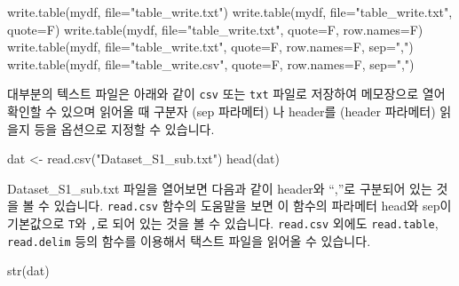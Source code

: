 \documentclass[
]{book}
\newenvironment{Shaded}{\begin{snugshade}}{\end{snugshade}}
\newcommand{\AttributeTok}[1]{\textcolor[rgb]{0.77,0.63,0.00}{#1}}
\newcommand{\FunctionTok}[1]{\textcolor[rgb]{0.00,0.00,0.00}{#1}}
\newcommand{\NormalTok}[1]{#1}
\newcommand{\OtherTok}[1]{\textcolor[rgb]{0.56,0.35,0.01}{#1}}
\newcommand{\StringTok}[1]{\textcolor[rgb]{0.31,0.60,0.02}{#1}}
\begin{document}
\begin{Shaded}
\begin{Highlighting}[]

\FunctionTok{write.table}\NormalTok{(mydf, }\AttributeTok{file=}\StringTok{"table\_write.txt"}\NormalTok{)}
\FunctionTok{write.table}\NormalTok{(mydf, }\AttributeTok{file=}\StringTok{"table\_write.txt"}\NormalTok{, }\AttributeTok{quote=}\NormalTok{F)}
\FunctionTok{write.table}\NormalTok{(mydf, }\AttributeTok{file=}\StringTok{"table\_write.txt"}\NormalTok{, }\AttributeTok{quote=}\NormalTok{F, }\AttributeTok{row.names=}\NormalTok{F)}
\FunctionTok{write.table}\NormalTok{(mydf, }\AttributeTok{file=}\StringTok{"table\_write.txt"}\NormalTok{, }\AttributeTok{quote=}\NormalTok{F, }\AttributeTok{row.names=}\NormalTok{F, }\AttributeTok{sep=}\StringTok{","}\NormalTok{)}
\FunctionTok{write.table}\NormalTok{(mydf, }\AttributeTok{file=}\StringTok{"table\_write.csv"}\NormalTok{, }\AttributeTok{quote=}\NormalTok{F, }\AttributeTok{row.names=}\NormalTok{F, }\AttributeTok{sep=}\StringTok{","}\NormalTok{)}
\end{Highlighting}
\end{Shaded}

대부분의 텍스트 파일은 아래와 같이 \texttt{csv} 또는 \texttt{txt} 파일로 저장하여 메모장으로 열어 확인할 수 있으며 읽어올 때 구분자 (sep 파라메터) 나 header를 (header 파라메터) 읽을지 등을 옵션으로 지정할 수 있습니다.

\begin{Shaded}
\begin{Highlighting}[]
\NormalTok{dat }\OtherTok{\textless{}{-}} \FunctionTok{read.csv}\NormalTok{(}\StringTok{"Dataset\_S1\_sub.txt"}\NormalTok{)}
\FunctionTok{head}\NormalTok{(dat)}
\end{Highlighting}
\end{Shaded}

Dataset\_S1\_sub.txt 파일을 열어보면 다음과 같이 header와 ``,''로 구분되어 있는 것을 볼 수 있습니다. \texttt{read.csv} 함수의 도움말을 보면 이 함수의 파라메터 head와 sep이 기본값으로 \texttt{T}와 \texttt{,}로 되어 있는 것을 볼 수 있습니다. \texttt{read.csv} 외에도 \texttt{read.table}, \texttt{read.delim} 등의 함수를 이용해서 택스트 파일을 읽어올 수 있습니다.

\begin{Shaded}
\begin{Highlighting}[]
\FunctionTok{str}\NormalTok{(dat)}
\end{Highlighting}
\end{Shaded}
\end{document}
